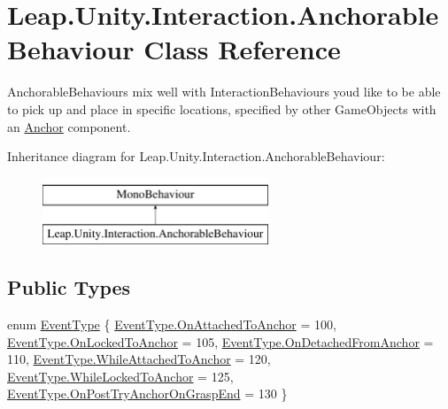 \hypertarget{class_leap_1_1_unity_1_1_interaction_1_1_anchorable_behaviour}{}\section{Leap.\+Unity.\+Interaction.\+Anchorable\+Behaviour Class Reference}
\label{class_leap_1_1_unity_1_1_interaction_1_1_anchorable_behaviour}


Anchorable\+Behaviours mix well with Interaction\+Behaviours you\textquotesingle{}d like to be able to pick up and place in specific locations, specified by other Game\+Objects with an \mbox{\hyperlink{class_leap_1_1_unity_1_1_interaction_1_1_anchor}{Anchor}} component.  


Inheritance diagram for Leap.\+Unity.\+Interaction.\+Anchorable\+Behaviour\+:\begin{figure}[H]
\begin{center}
\leavevmode
\includegraphics[height=2.000000cm]{class_leap_1_1_unity_1_1_interaction_1_1_anchorable_behaviour}
\end{center}
\end{figure}
\subsection*{Public Types}
\begin{DoxyCompactItemize}
\item 
enum \mbox{\hyperlink{class_leap_1_1_unity_1_1_interaction_1_1_anchorable_behaviour_aaca223949e4a2b5124579fe4681e3d47}{Event\+Type}} \{ \newline
\mbox{\hyperlink{class_leap_1_1_unity_1_1_interaction_1_1_anchorable_behaviour_aaca223949e4a2b5124579fe4681e3d47a8fe9b98c14ebd17ac7f0e3c8ba923944}{Event\+Type.\+On\+Attached\+To\+Anchor}} = 100, 
\mbox{\hyperlink{class_leap_1_1_unity_1_1_interaction_1_1_anchorable_behaviour_aaca223949e4a2b5124579fe4681e3d47a9ce8edabfaf09948f4eff72538fcac46}{Event\+Type.\+On\+Locked\+To\+Anchor}} = 105, 
\mbox{\hyperlink{class_leap_1_1_unity_1_1_interaction_1_1_anchorable_behaviour_aaca223949e4a2b5124579fe4681e3d47aad914a529fdcf57a4363a170a05402b7}{Event\+Type.\+On\+Detached\+From\+Anchor}} = 110, 
\mbox{\hyperlink{class_leap_1_1_unity_1_1_interaction_1_1_anchorable_behaviour_aaca223949e4a2b5124579fe4681e3d47a444f4bd1f854963f616a493fcd01af5f}{Event\+Type.\+While\+Attached\+To\+Anchor}} = 120, 
\newline
\mbox{\hyperlink{class_leap_1_1_unity_1_1_interaction_1_1_anchorable_behaviour_aaca223949e4a2b5124579fe4681e3d47abcaabb71f349d213b8ba141b0cdd51ee}{Event\+Type.\+While\+Locked\+To\+Anchor}} = 125, 
\mbox{\hyperlink{class_leap_1_1_unity_1_1_interaction_1_1_anchorable_behaviour_aaca223949e4a2b5124579fe4681e3d47a0dd02e8ea255b5e73476e0b363428d50}{Event\+Type.\+On\+Post\+Try\+Anchor\+On\+Grasp\+End}} = 130
 \}
\end{DoxyCompactItemize}
